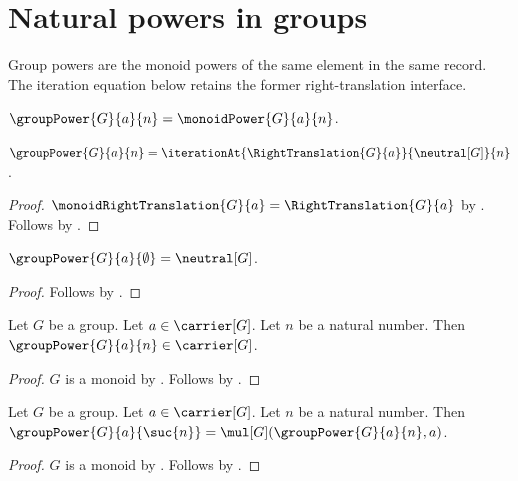 


\section{Natural powers in groups}

Group powers are the monoid powers of the same element in the same record.
The iteration equation below retains the former right-translation interface.

\begin{definition}\label{group_power}
    $\groupPower{G}{a}{n}=\monoidPower{G}{a}{n}$.
\end{definition}

\begin{proposition}\label{group_power_iteration_eq}
    $\groupPower{G}{a}{n}=
        \iterationAt{\RightTranslation{G}{a}}{\neutral[G]}{n}$.
\end{proposition}
\begin{proof}
    $\monoidRightTranslation{G}{a}=\RightTranslation{G}{a}$ by
        .
    Follows by .
\end{proof}

\begin{proposition}\label{group_power_zero}
    $\groupPower{G}{a}{\emptyset}=\neutral[G]$.
\end{proposition}
\begin{proof}
    Follows by .
\end{proof}

\begin{proposition}\label{group_power_type}
    Let $G$ be a group.
    Let $a\in\carrier[G]$.
    Let $n$ be a natural number.
    Then $\groupPower{G}{a}{n}\in\carrier[G]$.
\end{proposition}
\begin{proof}
    $G$ is a monoid by .
    Follows by .
\end{proof}

\begin{proposition}\label{group_power_successor}
    Let $G$ be a group.
    Let $a\in\carrier[G]$.
    Let $n$ be a natural number.
    Then $\groupPower{G}{a}{\suc{n}}=
        \mul[G](\groupPower{G}{a}{n},a)$.
\end{proposition}
\begin{proof}
    $G$ is a monoid by .
    Follows by .
\end{proof}

